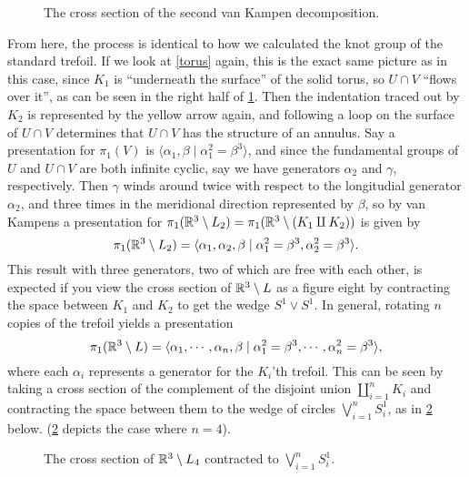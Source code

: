 \begin{solution}
    \begin{figure}[H]
    \centering
    \caption{The cross section of the second van Kampen decomposition.}
    \label{tk2}
    \end{figure}
    From here, the process is identical to how we calculated the knot group of the standard trefoil. If we look at \cref{torus} again, this is the exact same picture as in this case, since $K_1$ is ``underneath the surface'' of the solid torus, so $U \cap V$ ``flows over it'', as can be seen in the right half of \cref{tk2}. Then the indentation traced out by $K_2$ is represented by the yellow arrow again, and following a loop on the surface of $U \cap V$ determines that $U \cap V$ has the structure of an annulus. Say a presentation for $\pi_1(V)$ is $\langle \alpha_1,\beta  \mid \alpha_1^2=\beta ^3  \rangle $, and since the fundamental groups of $U$ and $U \cap V$ are both infinite cyclic, say we have generators $\alpha_2 $ and $\gamma $, respectively. Then $\gamma $ winds around twice with respect to the longitudial generator $\alpha_2 $, and three times in the meridional direction represented by $\beta $, so by van Kampens a presentation for $\pi_1(\mathbb{R}^3 \setminus L_2)= \pi_1(\mathbb{R}^3 \setminus (K_1 \amalg K_2))$ is given by \[
        \pi_1(\mathbb{R}^3\setminus L_2 )= \langle \alpha_1,\alpha_2,\beta  \mid \alpha_1^2=\beta ^3,\alpha_2^2=\beta ^3   \rangle .
    \] This result with three generators, two of which are free with each other, is expected if you view the cross section of $\mathbb{R}^3 \setminus L$ as a figure eight by contracting the space between $K_1$ and $K_2$ to get the wedge $S^1 \vee S^1 $. In general, rotating $n$ copies of the trefoil yields a presentation \[
    \pi_1(\mathbb{R}^3 \setminus L) =\langle \alpha_1,\cdots ,\alpha _n,  \beta \mid \alpha_1^2=\beta ^3,\cdots ,\alpha _n^2 =\beta ^3 \rangle ,
\] where each $\alpha _i $ represents a generator for the $K_i $'th trefoil. This can be seen by taking a cross section of the complement of the disjoint union $\coprod_{i=1}^n K_i $ and contracting the space between them to the wedge of circles $\bigvee _{i=1}^n S^1_i $, as in \cref{tk4} below. (\cref{tk4} depicts the case where $n=4$).
\begin{figure}[H]
\centering
{}
\caption{The cross section of $\mathbb{R}^3 \setminus L_4$ contracted to $\bigvee_{i=1}^n  S^1 _i $.}
\label{tk4}
\end{figure}

\end{solution}
